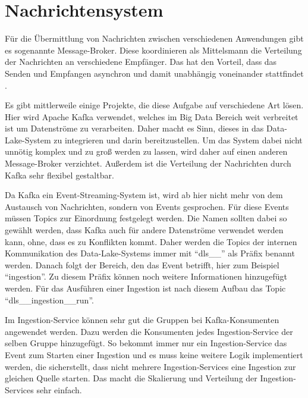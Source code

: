 \section{Nachrichtensystem}

Für die Übermittlung von Nachrichten zwischen verschiedenen Anwendungen gibt es sogenannte Message-Broker.
Diese koordinieren als Mittelsmann die Verteilung der Nachrichten an verschiedene Empfänger.
Das hat den Vorteil, dass das Senden und Empfangen asynchron und damit unabhängig voneinander stattfindet \parencite{message-broker}.

Es gibt mittlerweile einige Projekte, die diese Aufgabe auf verschiedene Art lösen.
Hier wird Apache Kafka verwendet, welches im Big Data Bereich weit verbreitet ist um Datenströme zu verarbeiten.
Daher macht es Sinn, dieses in das Data-Lake-System zu integrieren und darin bereitzustellen.
Um das System dabei nicht unnötig komplex und zu groß werden zu lassen, wird daher auf einen anderen Message-Broker verzichtet.
Außerdem ist die Verteilung der Nachrichten durch Kafka sehr flexibel gestaltbar.

Da Kafka ein Event-Streaming-System ist, wird ab hier nicht mehr von dem Austausch von Nachrichten, sondern von Events gesprochen.
Für diese Events müssen Topics zur Einordnung festgelegt werden.
Die Namen sollten dabei so gewählt werden, dass Kafka auch für andere Datenströme verwendet werden kann, ohne, dass es zu Konflikten kommt.
Daher werden die Topics der internen Kommunikation des Data-Lake-Systems immer mit "`dls\_\_"' als Präfix benannt werden.
Danach folgt der Bereich, den das Event betrifft, hier zum Beispiel "`ingestion"'.
Zu diesem Präfix können noch weitere Informationen hinzugefügt werden.
Für das Ausführen einer Ingestion ist nach diesem Aufbau das Topic "`dls\_\_ingestion\_\_run"'.

Im Ingestion-Service können sehr gut die Gruppen bei Kafka-Konsumenten angewendet werden.
Dazu werden die Konsumenten jedes Ingestion-Service der selben Gruppe hinzugefügt.
So bekommt immer nur ein Ingestion-Service das Event zum Starten einer Ingestion und es muss keine weitere Logik implementiert werden, die sicherstellt, dass nicht mehrere Ingestion-Services eine Ingestion zur gleichen Quelle starten.
Das macht die Skalierung und Verteilung der Ingestion-Services sehr einfach.